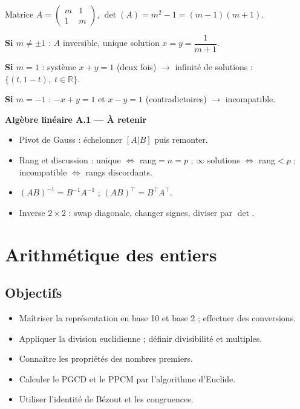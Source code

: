 \documentclass[11pt,a4paper,twoside]{book}
\newcommand{\R}{\mathbb{R}}
\begin{document}
\begin{correctionbox}[Correction]
Matrice $A=\begin{pmatrix}m&1\\1&m\end{pmatrix}$, $\det(A)=m^2-1=(m-1)(m+1)$.

\textbf{Si $m\neq\pm1$} : $A$ inversible, unique solution $x=y=\dfrac{1}{m+1}$.

\textbf{Si $m=1$} : système $x+y=1$ (deux fois) $\to$ infinité de solutions : $\{(t,1-t),\;t\in\R\}$.

\textbf{Si $m=-1$} : $-x+y=1$ et $x-y=1$ (contradictoires) $\to$ incompatible.
\end{correctionbox}

\begin{retenirbox}
\textbf{Algèbre linéaire A.1 — À retenir}
\begin{itemize}
  \item Pivot de Gauss : échelonner $[A|B]$ puis remonter.
  \item Rang et discussion : unique $\iff$ rang$=n=p$ ; $\infty$ solutions $\iff$ rang$<p$ ; incompatible $\iff$ rangs discordants.
  \item $(AB)^{-1}=B^{-1}A^{-1}$ ; $(AB)^\top=B^\top A^\top$.
  \item Inverse $2\times2$ : swap diagonale, changer signes, diviser par $\det$.
\end{itemize}
\end{retenirbox}

\chapter{Arithmétique des entiers}

\section*{Objectifs}
\begin{itemize}[leftmargin=1.5em]
  \item Maîtriser la représentation en base 10 et base 2 ; effectuer des conversions.
  \item Appliquer la division euclidienne ; définir divisibilité et multiples.
  \item Connaître les propriétés des nombres premiers.
  \item Calculer le PGCD et le PPCM par l'algorithme d'Euclide.
  \item Utiliser l'identité de Bézout et les congruences.
\end{itemize}
\end{document}
